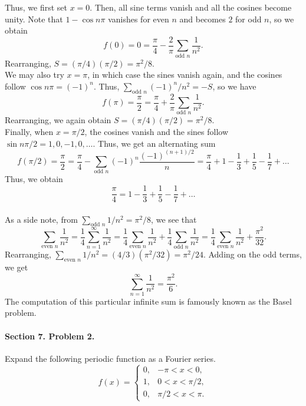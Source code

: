 \documentclass[10pt]{article}
\begin{document}
        Thus, we first set $x = 0$. Then, all sine terms vanish and all the cosines become unity. Note that $1 - \cos{n\pi}$ vanishes for
        even $n$ and becomes $2$ for odd $n$, so we obtain
        \[
                f(0) = 0 = \frac{\pi}{4} - \frac{2}{\pi}\sum_{\text{odd }n} \frac{1}{n^2}.
        \]
        Rearranging, $S = (\pi/4)(\pi/2) = \pi^2 /8$. \\

        We may also try $x = \pi$, in which case the sines vanish again, and the cosines follow $\cos{n\pi} = (-1)^n$.
        Thus, $\sum_{\text{odd }n} (-1)^n /n^2 = -S$, so we have
        \[
                f(\pi) = \frac{\pi}{2} = \frac{\pi}{4} + \frac{2}{\pi}\sum_{\text{odd }n} \frac{1}{n^2}.
        \]
        Rearranging, we again obtain $S = (\pi /4)(\pi /2) = \pi^2 /8$. \\

        Finally, when $x = \pi/2$, the cosines vanish and the sines follow $\sin{n\pi /2} = 1, 0, -1, 0, \dots$. 
        Thus, we get an alternating sum
        \[
                f(\pi/2) = \frac{\pi}{2} = \frac{\pi}{4} - \sum_{\text{odd }n} (-1)^n \frac{(-1)^{(n + 1)/2}}{n} 
                        = \frac{\pi}{4} + 1 - \frac{1}{3} + \frac{1}{5} - \frac{1}{7} + \dots
        \]
        Thus, we obtain
        \[
                \frac{\pi}{4} = 1 - \frac{1}{3} + \frac{1}{5} - \frac{1}{7} + \dots
        \]\\
        
        As a side note, from $\sum_{\text{odd }n} 1 /n^2 = \pi^2 /8$, we see that 
        \[
                \sum_{\text{even }n} \frac{1}{n^2} = \frac{1}{4}\sum_{n = 1}^\infty \frac{1}{n^2} = \frac{1}{4}\sum_{\text{even }n} \frac{1}{n^2}
                        + \frac{1}{4}\sum_{\text{odd }n} \frac{1}{n^2} = \frac{1}{4}\sum_{\text{even }n} \frac{1}{n^2} + \frac{\pi^2}{32}.
        \]
        Rearranging, $\sum_{\text{even }n} 1 /n^2 = (4 /3)(\pi^2 / 32) = \pi^2 /24$. Adding on the odd terms, we get
        \[
                \sum_{n = 1}^\infty \frac{1}{n^2} = \frac{\pi^2}{6}.
        \]
        The computation of this particular infinite sum is famously known as the Basel problem.


        \paragraph{Section 7. Problem 2.} Expand the following periodic function as a Fourier series.
        \[
                f(x) = \begin{cases}
                        0, & -\pi < x < 0,      \\
                        1, & 0 < x < \pi/2,     \\
                        0, & \pi/2 < x < \pi.
                \end{cases}
        \]
        
\end{document}
